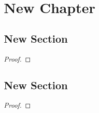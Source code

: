 \chapter{New Chapter}
\section{New Section}
\begin{theorem}
    \lipsum[1]
\end{theorem}
\begin{proof}
    \lipsum[1]
\end{proof}

\begin{definition}
    \lipsum[1]
\end{definition}

\begin{note}
    \lipsum[1]
\end{note}

\begin{example}
    \lipsum[1]
\end{example}
\begin{solution}
    \lipsum[1]
\end{solution}

\begin{problem}
    \lipsum[1]
\end{problem}
\begin{solution}
    \lipsum[1]
\end{solution}

\section{New Section}
\begin{theorem}
    \lipsum[1]
\end{theorem}
\begin{proof}
    \lipsum[1]
\end{proof}

\begin{definition}
    \lipsum[1]
\end{definition}

\begin{note}
    \lipsum[1]
\end{note}

\begin{example}
    \lipsum[1]
\end{example}
\begin{solution}
    \lipsum[1]
\end{solution}

